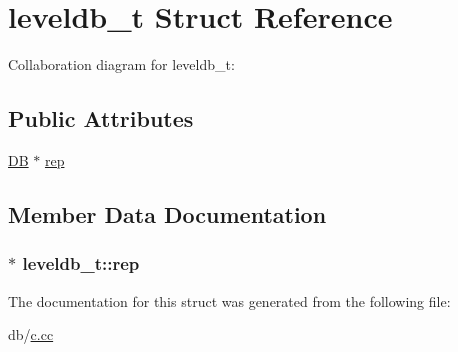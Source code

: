 \hypertarget{structleveldb__t}{\section{leveldb\-\_\-t Struct Reference}
\label{structleveldb__t}
}


Collaboration diagram for leveldb\-\_\-t\-:
\subsection*{Public Attributes}
\begin{DoxyCompactItemize}
\item 
\hyperlink{classleveldb_1_1_d_b}{D\-B} $\ast$ \hyperlink{structleveldb__t_af8f1950b2c676ccc37e4095f558261ad}{rep}
\end{DoxyCompactItemize}


\subsection{Member Data Documentation}
\hypertarget{structleveldb__t_af8f1950b2c676ccc37e4095f558261ad}{
\subsubsection[{rep}]{$\ast$ leveldb\-\_\-t\-::rep}}\label{structleveldb__t_af8f1950b2c676ccc37e4095f558261ad}


The documentation for this struct was generated from the following file\-:\begin{DoxyCompactItemize}
\item 
db/\hyperlink{c_8cc}{c.\-cc}\end{DoxyCompactItemize}
